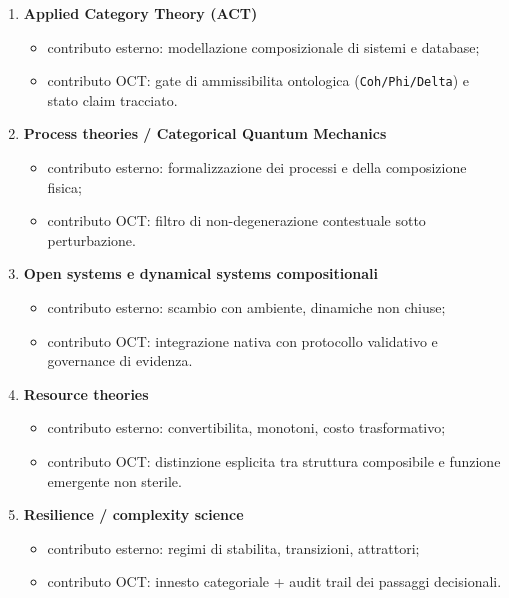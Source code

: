 \begin{enumerate}
\def\labelenumi{\arabic{enumi}.}
\item
  \textbf{Applied Category Theory (ACT)}

  \begin{itemize}
  \tightlist
  \item
    contributo esterno: modellazione composizionale di sistemi e database;
  \item
    contributo OCT: gate di ammissibilita ontologica (\texttt{Coh/Phi/Delta}) e stato claim tracciato.
  \end{itemize}
\item
  \textbf{Process theories / Categorical Quantum Mechanics}

  \begin{itemize}
  \tightlist
  \item
    contributo esterno: formalizzazione dei processi e della composizione fisica;
  \item
    contributo OCT: filtro di non-degenerazione contestuale sotto perturbazione.
  \end{itemize}
\item
  \textbf{Open systems e dynamical systems compositionali}

  \begin{itemize}
  \tightlist
  \item
    contributo esterno: scambio con ambiente, dinamiche non chiuse;
  \item
    contributo OCT: integrazione nativa con protocollo validativo e governance di evidenza.
  \end{itemize}
\item
  \textbf{Resource theories}

  \begin{itemize}
  \tightlist
  \item
    contributo esterno: convertibilita, monotoni, costo trasformativo;
  \item
    contributo OCT: distinzione esplicita tra struttura composibile e funzione emergente non sterile.
  \end{itemize}
\item
  \textbf{Resilience / complexity science}

  \begin{itemize}
  \tightlist
  \item
    contributo esterno: regimi di stabilita, transizioni, attrattori;
  \item
    contributo OCT: innesto categoriale + audit trail dei passaggi decisionali.
  \end{itemize}
\end{enumerate}

